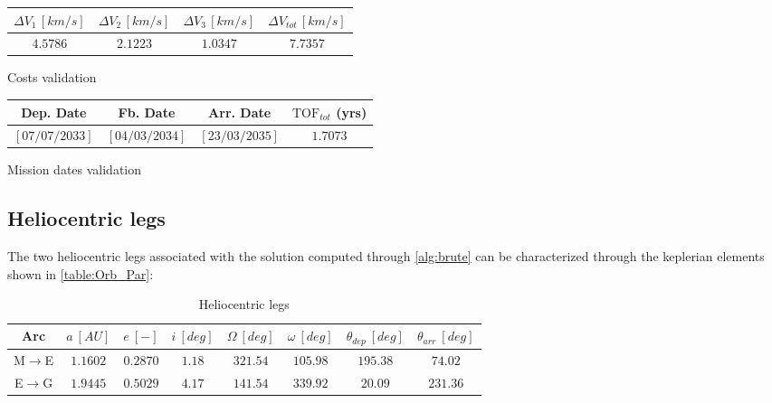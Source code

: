 \begin{minipage}{0.5\linewidth}
    \centering
    \small
    \captionsetup{type=table}
    \begin{tabular}{|c|c|c|c|}
        \hline
        $\Delta V_1 \, [km/s]$ & $\Delta V_2 \, [km/s]$ & $\Delta V_3 \, [km/s]$ & $\Delta V_{tot} \, [km/s]$\\
        \hline
        $4.5786$ & $2.1223$ & $1.0347$ & $7.7357$\\
        \hline
    \end{tabular}
    \caption{Costs validation}
    \label{table:cost_validation}
\end{minipage}\hfill
\begin{minipage}{0.5\linewidth}
    \centering
    \small
    \captionsetup{type=table}
    \begin{tabular}{|c|c|c|c|}
        \hline
        Dep. Date & Fb. Date & Arr. Date & $\text{TOF}_{tot}$ (yrs) \\
        \hline
        $\left[07/07/2033 \right]$ & $\left[04/03/2034\right]$ & $\left[23/03/2035\right]$ & $1.7073$\\
        \hline
    \end{tabular}
    \caption{Mission dates validation}
    \label{table:date_validation}
\end{minipage}

\subsection{Heliocentric legs}
\label{subsec:heliocentric}
The two heliocentric legs associated with the solution computed through \autoref{alg:brute} can be characterized through the keplerian elements shown in \autoref{table:Orb_Par}:
\vspace*{-0.2cm}
\begin{table}[H]

    \centering
    \small
    \begin{tabular}{|c|c|c|c|c|c|c|c|}
    \hline
    Arc &  $a  \ [AU]$ & $e \ [-]$ & $i \ [deg]$ & $\Omega \ [deg]$ & $\omega \ [deg]$ & $\theta_{dep} \ [deg]$ & $\theta_{arr} \ [deg]$ \\
    \hline
    M$\to$E &  $1.1602$ & $0.2870$ & $1.18$ & $321.54$ & $105.98$ & $195.38$ & $74.02$ \\
    \hline
    E$\to$G & $1.9445$ & $0.5029$ & $4.17$ & $141.54$ & $339.92$ & $20.09$ & $231.36$ \\
    \hline
    \end{tabular}
    
    \caption{Heliocentric legs}
    \label{table:Orb_Par}
\end{table}

